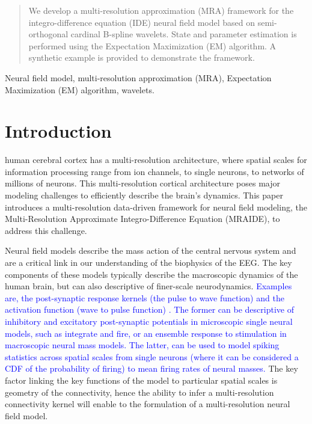 \documentclass[11pt,draftcls,onecolumn,peerreview]{IEEEtran}
\newcommand{\parham}[1]{\textcolor{blue}{#1}}
\begin{document}
\begin{abstract}
We develop a multi-resolution approximation (MRA) framework for the integro-difference equation (IDE) neural field model based on semi-orthogonal cardinal B-spline wavelets. State and parameter estimation is performed using the Expectation Maximization (EM) algorithm. A synthetic example is provided
to demonstrate the framework.
\end{abstract}
 \begin{IEEEkeywords}
  Neural field model, multi-resolution approximation (MRA), Expectation Maximization (EM) algorithm, wavelets.
  \end{IEEEkeywords}
%
\IEEEpeerreviewmaketitle


\section{Introduction}
 human cerebral cortex has a multi-resolution architecture, where spatial scales for information processing range from ion channels, to single neurons, to networks of millions of neurons. This multi-resolution cortical architecture poses major modeling challenges to efficiently describe the brain's dynamics. This paper introduces a multi-resolution data-driven framework for neural field modeling, the Multi-Resolution Approximate Integro-Difference Equation (MRAIDE), to address this challenge. 

Neural field models describe the mass action of the central nervous system and are a critical link in our understanding of the biophysics of the EEG. The key components of these models typically describe the macroscopic dynamics of the human brain, but can also descriptive of finer-scale neurodynamics. \parham{Examples are, the post-synaptic response kernels (the pulse to wave function) and the activation function (wave to pulse function) \cite{Jirsa1997}. The former can be descriptive of inhibitory and excitatory post-synaptic potentials in microscopic single neural models, such as integrate and fire, or an ensemble response to stimulation in macroscopic neural mass models. The latter,  can be used to model spiking statistics across spatial scales from single neurons (where it can be considered a CDF of the probability of firing) to mean firing rates of neural masses.} The key factor linking the key functions of the model to particular spatial scales is geometry of the connectivity, hence the ability to infer a multi-resolution connectivity kernel will enable to the formulation of a multi-resolution neural field model. 
\end{document}
